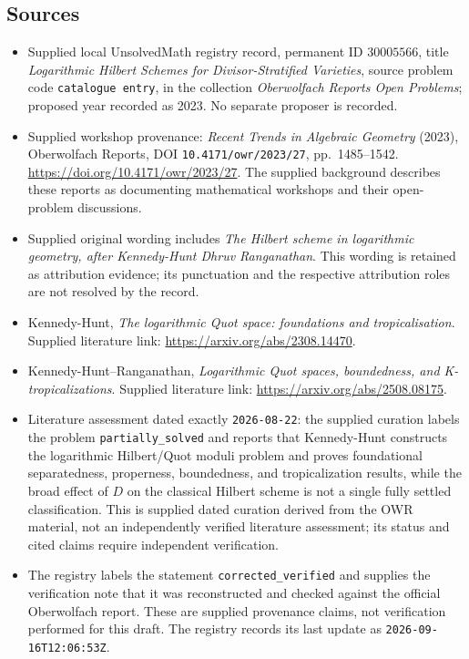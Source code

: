 \documentclass[11pt]{article}
\begin{document}
\subsection{Sources}
\begin{itemize}
\item Supplied local UnsolvedMath registry record, permanent ID \(30005566\), title \emph{Logarithmic Hilbert Schemes for Divisor-Stratified Varieties}, source problem code \texttt{catalogue entry}, in the collection \emph{Oberwolfach Reports Open Problems}; proposed year recorded as 2023. No separate proposer is recorded.
\item Supplied workshop provenance: \emph{Recent Trends in Algebraic Geometry} (2023), Oberwolfach Reports, DOI \texttt{10.4171/owr/2023/27}, pp.~1485--1542. \url{https://doi.org/10.4171/owr/2023/27}. The supplied background describes these reports as documenting mathematical workshops and their open-problem discussions.
\item Supplied original wording includes \emph{The Hilbert scheme in logarithmic geometry, after Kennedy-Hunt Dhruv Ranganathan}. This wording is retained as attribution evidence; its punctuation and the respective attribution roles are not resolved by the record.
\item Kennedy-Hunt, \emph{The logarithmic Quot space: foundations and tropicalisation}. Supplied literature link: \url{https://arxiv.org/abs/2308.14470}.
\item Kennedy-Hunt--Ranganathan, \emph{Logarithmic Quot spaces, boundedness, and K-tropicalizations}. Supplied literature link: \url{https://arxiv.org/abs/2508.08175}.
\item Literature assessment dated exactly \texttt{2026-08-22}: the supplied curation labels the problem \texttt{partially\_solved} and reports that Kennedy-Hunt constructs the logarithmic Hilbert/Quot moduli problem and proves foundational separatedness, properness, boundedness, and tropicalization results, while the broad effect of \(D\) on the classical Hilbert scheme is not a single fully settled classification. This is supplied dated curation derived from the OWR material, not an independently verified literature assessment; its status and cited claims require independent verification.
\item The registry labels the statement \texttt{corrected\_verified} and supplies the verification note that it was reconstructed and checked against the official Oberwolfach report. These are supplied provenance claims, not verification performed for this draft. The registry records its last update as \texttt{2026-09-16T12:06:53Z}.
\end{itemize}
\end{document}

